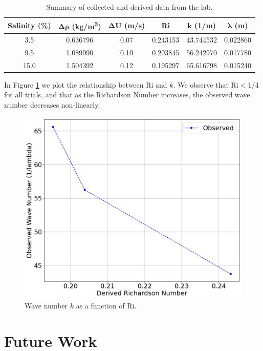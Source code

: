 \documentclass{article}
\begin{document}
\begin{table}[h!]
    \centering
    \begin{tabular}{|c|c|c|c|c|c|}
    \hline
    \textbf{Salinity (\%)} & $\bm{\Delta \rho}$ \textbf{(kg/m\textsuperscript{3})} & $\bm{\Delta U}$ \textbf{(m/s)}& \textbf{Ri} & $\bm{k}$ \textbf{(1/m)}& $\bm{\lambda}$ \textbf{(m)}\\ \hline
    3.5 & 0.636796 & 0.07 & 0.243153 & 43.744532 & 0.022860 \\
    9.5 & 1.089990 & 0.10 & 0.203845 & 56.242970 & 0.017780 \\
    15.0 & 1.504392 & 0.12 & 0.195297 & 65.616798 & 0.015240 \\
    \hline
    \end{tabular}
    \caption{Summary of collected and derived data from the lab.}
    \label{tab:data}
\end{table}

In Figure \ref{graph:Ri-vs-k} we plot the relationship between Ri and \(k\). We observe that \(\text{Ri} < 1/4\) for all trials, and that as the Richardson Number increases, the observed wave number decreases non-linearly.

\begin{figure}[h!]
    \centering
    \includegraphics[width=5in]{RivsK.png}
    \caption{Wave number $k$ as a function of Ri.}
    \label{graph:Ri-vs-k}
\end{figure}

\section{Future Work}
\end{document}
